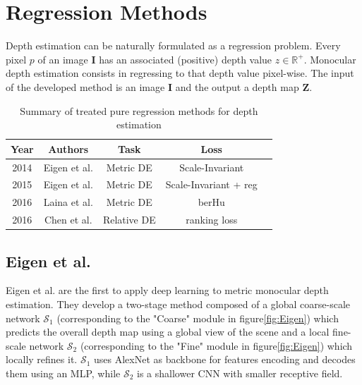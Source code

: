 \section{Regression Methods}
Depth estimation can be naturally formulated as a regression problem.
Every pixel $p$ of an image $\mathbf{I}$ has an associated (positive) depth value $z \in \mathbb{R}^{+}$.
Monocular depth estimation consists in regressing to that depth value pixel-wise.
The input of the developed method is an image $\mathbf{I}$ and the output a depth map $\mathbf{Z}$.

\label{s:regression_methods}

\begin{center}
\begin{table}[h!]
\begin{tabular}{| c | c | c | c | c |}
\hline
\textbf{Year} & \textbf{Authors} & \textbf{Task} & \textbf{Loss} \\
\hline
2014 & Eigen et al. \cite{Eigen} & Metric DE & Scale-Invariant\\
2015 & Eigen et al. \cite{Eigen2} & Metric DE & Scale-Invariant + reg\\
2016 & Laina et al. \cite{Laina} & Metric DE & berHu\\
2016 & Chen et al. \cite{DIW} & Relative DE & ranking loss\\
\hline
\end{tabular}
\caption{Summary of treated pure regression methods for depth estimation}
\label{table:1}
\end{table}
\end{center}

\subsection{Eigen et al.}
Eigen et al. \cite{Eigen} are the first to apply deep learning to metric monocular depth estimation.
They develop a two-stage method composed of a global coarse-scale network $\mathcal{S}_{1}$ (corresponding to the "Coarse" module in figure\ref{fig:Eigen}) which predicts the overall depth map using a global view of the scene and a local fine-scale network $\mathcal{S}_{2}$ (corresponding to the "Fine" module in figure\ref{fig:Eigen}) which locally refines it.
$\mathcal{S}_{1}$ uses AlexNet \cite{AlexNet} as backbone for features encoding and decodes them using an MLP, while $\mathcal{S}_{2}$ is a shallower CNN with smaller receptive field.

